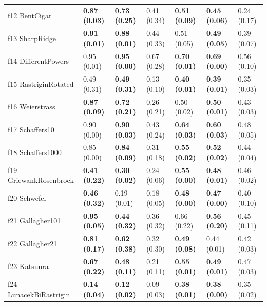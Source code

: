 \begin{table}
\begin{tabular}{lllllll}
f12 BentCigar & \textbf{0.87 (0.03)} & \textbf{0.73 (0.25)} & 0.41 (0.34) & \textbf{0.51 (0.09)} & \textbf{0.45 (0.06)} & 0.24 (0.17) \\
f13 SharpRidge & \textbf{0.91 (0.01)} & \textbf{0.88 (0.01)} & 0.44 (0.33) & 0.51 (0.05) & \textbf{0.49 (0.05)} & 0.39 (0.07) \\
f14 DifferentPowers & 0.95 (0.01) & \textbf{0.95 (0.00)} & 0.67 (0.28) & \textbf{0.70 (0.01)} & \textbf{0.69 (0.00)} & 0.56 (0.10) \\
f15 RastriginRotated & 0.49 (0.31) & \textbf{0.49 (0.31)} & 0.13 (0.10) & \textbf{0.40 (0.01)} & \textbf{0.39 (0.01)} & 0.35 (0.03) \\
f16 Weierstrass & \textbf{0.87 (0.09)} & \textbf{0.72 (0.21)} & 0.26 (0.21) & 0.50 (0.02) & \textbf{0.50 (0.01)} & 0.43 (0.03) \\
f17 Schaffers10 & 0.90 (0.00) & \textbf{0.90 (0.03)} & 0.43 (0.24) & \textbf{0.64 (0.03)} & \textbf{0.60 (0.03)} & 0.48 (0.05) \\
f18 Schaffers1000 & 0.85 (0.00) & \textbf{0.84 (0.09)} & 0.31 (0.18) & \textbf{0.55 (0.02)} & \textbf{0.52 (0.02)} & 0.44 (0.04) \\
f19 GriewankRosenbrock & \textbf{0.41 (0.22)} & \textbf{0.30 (0.02)} & 0.24 (0.06) & \textbf{0.55 (0.00)} & \textbf{0.48 (0.01)} & 0.46 (0.02) \\
f20 Schwefel & \textbf{0.46 (0.32)} & 0.19 (0.01) & 0.18 (0.05) & \textbf{0.48 (0.00)} & \textbf{0.47 (0.00)} & 0.40 (0.10) \\
f21 Gallagher101 & \textbf{0.95 (0.05)} & \textbf{0.44 (0.32)} & 0.36 (0.32) & 0.66 (0.22) & \textbf{0.56 (0.20)} & 0.45 (0.11) \\
f22 Gallagher21 & \textbf{0.81 (0.17)} & \textbf{0.62 (0.38)} & 0.32 (0.30) & \textbf{0.49 (0.08)} & 0.44 (0.01) & 0.42 (0.03) \\
f23 Katsuura & \textbf{0.67 (0.22)} & \textbf{0.48 (0.11)} & 0.21 (0.11) & \textbf{0.55 (0.01)} & \textbf{0.49 (0.01)} & 0.47 (0.03) \\
f24 LunacekBiRastrigin & \textbf{0.14 (0.04)} & \textbf{0.12 (0.02)} & 0.09 (0.03) & \textbf{0.38 (0.01)} & \textbf{0.38 (0.00)} & 0.35 (0.02) \\
\bottomrule
\end{tabular}
\end{table}
